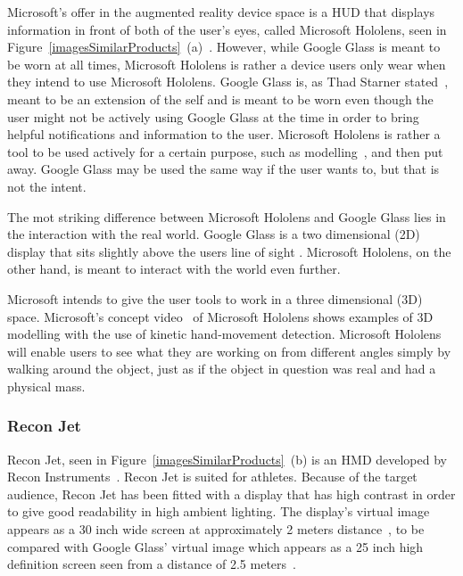 Microsoft's offer in the augmented reality device space is a HUD that displays information in front of both of the user's eyes, called Microsoft Hololens, seen in Figure~\ref{imagesSimilarProducts}~(a)~\cite{hololens}. 
However, while Google Glass is meant to be worn at all times, Microsoft Hololens is rather a device users only wear when they intend to use Microsoft Hololens. Google Glass is, as Thad Starner stated~\cite{6504855}, meant to be an extension of the self and is meant to be worn even though the user might not be actively using Google Glass at the time in order to bring helpful notifications and information to the user. Microsoft Hololens is rather a tool to be used actively for a certain purpose, such as modelling~\cite{hololensDemo}, and then put away. Google Glass may be used the same way if the user wants to, but that is not the intent.

The mot striking difference between Microsoft Hololens and Google Glass lies in the interaction with the real world. Google Glass is a two dimensional (2D) display that sits slightly above the users line of sight%
. Microsoft Hololens, on the other hand, is meant to interact with the world even further.

Microsoft intends to give the user tools to work in a three dimensional (3D) space. Microsoft's concept video~\cite{hololensConceptVideo} of Microsoft Hololens shows examples of 3D modelling with the use of kinetic hand-movement detection. Microsoft Hololens will enable users to see what they are working on from different angles simply by walking around the object, just as if the object in question was real and had a physical mass.

\subsubsection{Recon Jet}

Recon Jet, seen in Figure~\ref{imagesSimilarProducts}~(b) is an HMD developed by Recon Instruments~\cite{reconJet}. Recon Jet is suited for athletes. Because of the target audience, Recon Jet has been fitted with a display that has high contrast in order to give good readability in high ambient lighting. The display's virtual image appears as  a 30 inch wide screen at approximately 2 meters distance~\cite{reconJetSpecs}, to be compared with Google Glass' virtual image which appears as a 25 inch high definition screen seen from a distance of 2.5 meters~\cite{GlassSpecs}.

